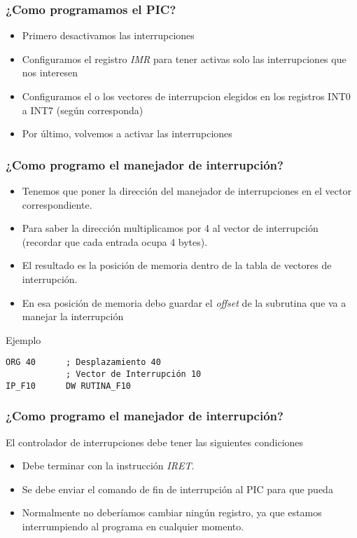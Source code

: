 \documentclass{beamer}
\begin{document}
\begin{frame}
\frametitle{¿Como programamos el PIC?}

\begin{itemize}
 \item Primero desactivamos las interrupciones
 \item Configuramos el registro \emph{IMR} para tener activas solo las interrupciones que nos interesen
 \item Configuramos el o los vectores de interrupcion elegidos en los registros INT0 a INT7 (según corresponda)
 \item Por último, volvemos a activar las interrupciones
\end{itemize}

\end{frame}

\begin{frame}[fragile]
\frametitle{¿Como programo el manejador de interrupción?}

\begin{itemize}
 \item Tenemos que poner la dirección del manejador de interrupciones en el vector correspondiente.
 \item Para saber la dirección multiplicamos por 4 al vector de interrupción (recordar que cada entrada ocupa 4 bytes).
 \item El resultado es la posición de memoria dentro de la tabla de vectores de interrupción.
 \item En esa posición de memoria debo guardar el \emph{offset} de la subrutina que va a manejar la interrupción
\end{itemize}
\begin{block}{Ejemplo}
\begin{verbatim}
ORG 40      ; Desplazamiento 40 
            ; Vector de Interrupción 10
IP_F10	    DW RUTINA_F10
\end{verbatim}
\end{block}

\end{frame}

\begin{frame}[fragile]
\frametitle{¿Como programo el manejador de interrupción?}
El controlador de interrupciones debe tener las siguientes condiciones
\begin{itemize} 
 \item Debe terminar con la instrucción \emph{IRET}.
 \item Se debe enviar el comando de fin de interrupción al PIC para que pueda 
 \item Normalmente no deberíamos cambiar ningún registro, ya que estamos interrumpiendo al programa en cualquier momento.
\end{itemize}
\end{frame}
\end{document}

